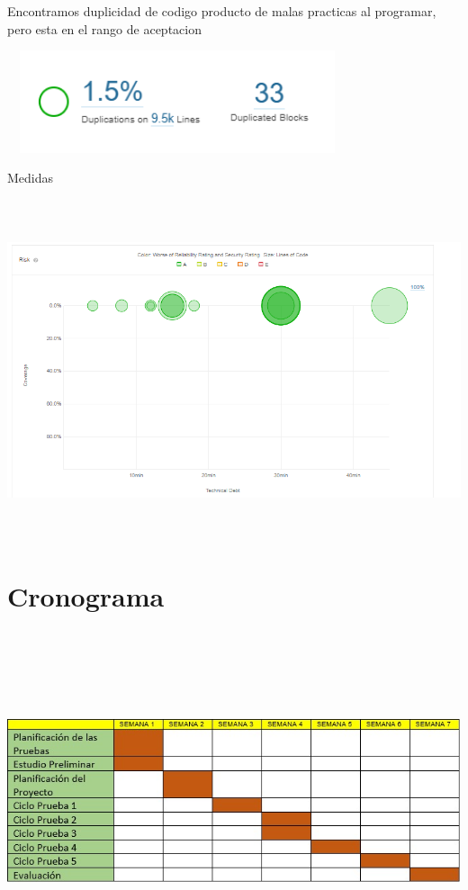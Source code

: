 \documentclass[12pt,letterpaper]{article}
\begin{document}
Encontramos duplicidad de codigo producto de malas practicas al programar,
 pero esta en el rango de aceptacion
 \begin{center}
    \includegraphics[width=10cm, height=3cm]{img/2scan7.png}  
\end{center}
\newpage
Medidas
\begin{center}
    \includegraphics[width=18cm, height=10cm]{img/2scanF.png}  
\end{center}


\section{Cronograma}    
\begin{center}
    \includegraphics[width=18cm, height=10cm]{img/crono.png}  
\end{center}
\end{document}
